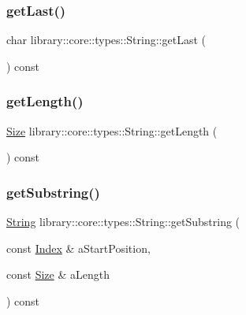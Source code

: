 \subsubsection{\texorpdfstring{get\+Last()}{getLast()}}
{\footnotesize\ttfamily char library\+::core\+::types\+::\+String\+::get\+Last (\begin{DoxyParamCaption}{ }\end{DoxyParamCaption}) const}

\mbox{\label{classlibrary_1_1core_1_1types_1_1_string_adc97f82ccc9a3d034bc3127e643199fb}} 
\subsubsection{\texorpdfstring{get\+Length()}{getLength()}}
{\footnotesize\ttfamily \hyperlink{namespacelibrary_1_1core_1_1types_a701626ea1027888ebbb8cfd0ff7adab0}{Size} library\+::core\+::types\+::\+String\+::get\+Length (\begin{DoxyParamCaption}{ }\end{DoxyParamCaption}) const}

\mbox{\label{classlibrary_1_1core_1_1types_1_1_string_aaf9377048b900766d05a1af9182cf251}} 
\subsubsection{\texorpdfstring{get\+Substring()}{getSubstring()}}
{\footnotesize\ttfamily \hyperlink{classlibrary_1_1core_1_1types_1_1_string}{String} library\+::core\+::types\+::\+String\+::get\+Substring (\begin{DoxyParamCaption}\item[{const \hyperlink{namespacelibrary_1_1core_1_1types_ad87eeb821d7067ec94e06ed1980d6350}{Index} \&}]{a\+Start\+Position,  }\item[{const \hyperlink{namespacelibrary_1_1core_1_1types_a701626ea1027888ebbb8cfd0ff7adab0}{Size} \&}]{a\+Length }\end{DoxyParamCaption}) const}

